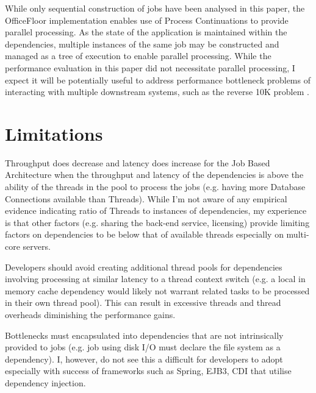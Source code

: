 \documentclass[conference]{ieee/IEEEtran}
\begin{document}
While only sequential construction of jobs have been analysed in this paper, the
OfficeFloor implementation enables use of Process Continuations
\cite{process-continuation} to provide parallel processing.  As the state
of the application is maintained within the dependencies, multiple instances of
the same job may be constructed and managed as a tree of execution to enable
parallel processing.  While the performance evaluation in this paper did not
necessitate parallel processing, I expect it will be potentially useful to
address performance bottleneck problems of interacting with multiple downstream
systems, such as the reverse 10K problem \cite{reverse-ten-k-problem}.
   

\section{Limitations}
Throughput does decrease and latency does increase for the Job Based
Architecture when the throughput and latency of the dependencies is above the
ability of the threads in the pool to process the jobs (e.g. having more
Database Connections available than Threads).  While I'm not aware of any
empirical evidence indicating ratio of Threads to instances of dependencies, my
experience is that other factors (e.g. sharing the back-end service, licensing)
provide limiting factors on dependencies to be below that of available threads
especially on multi-core servers.

Developers should avoid creating additional thread pools for dependencies
involving processing at similar latency to a thread context switch (e.g. a
local in memory cache dependency would likely not warrant related tasks to be
processed in their own thread pool).  This can result in excessive threads and
thread overheads diminishing the performance gains.

Bottlenecks must encapsulated into dependencies that are not intrinsically
provided to jobs (e.g. job using disk I/O must declare the file system as a
dependency).  I, however, do not see this a difficult for developers to adopt
especially with success of frameworks such as Spring, EJB3, CDI that utilise
dependency injection.
\end{document}
